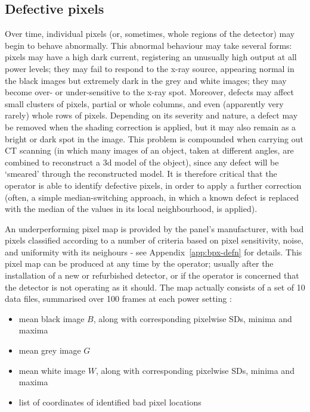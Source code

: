 \documentclass[\main/IO-Pixels.tex]{subfiles}
\begin{document}
\subsection{Defective pixels}

Over time, individual pixels (or, sometimes, whole regions of the detector) may begin to behave abnormally. This abnormal behaviour may take several forms: pixels may have a high dark current, registering an unusually high output at all power levels; they may fail to respond to the x-ray source, appearing normal in the black images but extremely dark in the grey and white images; they may become over- or under-sensitive to the x-ray spot. Moreover, defects may affect small clusters of pixels, partial or whole columns, and even (apparently very rarely) whole rows of pixels. Depending on its severity and nature, a defect may be removed when the shading correction is applied, but it may also remain as a bright or dark spot in the image. This problem is compounded when carrying out CT scanning (in which many images of an object, taken at different angles, are combined to reconstruct a 3d model of the object), since any defect will be `smeared' through the reconstructed model. It is therefore critical that the operator is able to identify defective pixels, in order to apply a further correction (often, a simple median-switching approach, in which a known defect is replaced with the median of the values in its local neighbourhood, is applied).

An underperforming pixel map is provided by the panel's manufacturer, with bad pixels classified according to a number of criteria based on pixel sensitivity, noise, and uniformity with its neighours - see Appendix~\ref{app:bpx-defn} for details. This pixel map can be produced at any time by the operator; usually after the installation of a new or refurbished detector, or if the operator is concerned that the detector is not operating as it should. The map actually consists of a set of 10 data files, summarised over 100 frames at each power setting :

\begin{itemize}
    \item mean black image $B$, along with corresponding pixelwise SDs, minima and maxima
    \vspace{- .8\baselineskip}
    \item mean grey image $G$
    \vspace{- .8\baselineskip}
    \item mean white image $W$, along with corresponding pixelwise SDs, minima and maxima
    \vspace{- .8\baselineskip}
    \item list of coordinates of identified bad pixel locations
\end{itemize}
\end{document}
